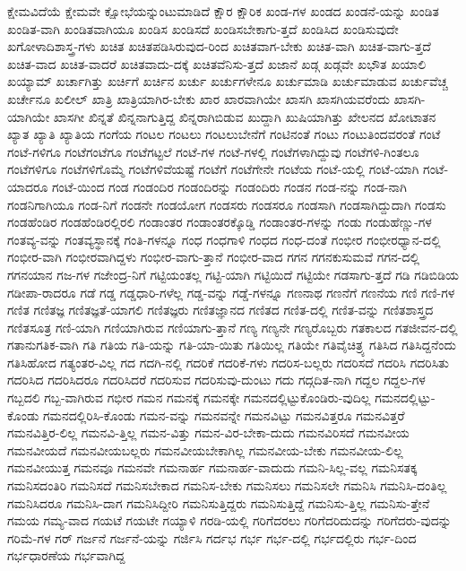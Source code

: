 {ಕ್ಷೇಮವಿದೆಯೆ
ಕ್ಷೇಮವೇ
ಕ್ಷೋಭೆಯನ್ನುಂಟುಮಾಡಿದೆ
ಕ್ಷೌರ
ಕ್ಷೌರಿಕ
ಖಂಡ-ಗಳ
ಖಂಡದ
ಖಂಡನೆ-ಯನ್ನು
ಖಂಡಿತ
ಖಂಡಿತ-ವಾಗಿ
ಖಂಡಿತವಾಗಿಯೂ
ಖಂಡಿಸ
ಖಂಡಿಸದೆ
ಖಂಡಿಸಬೇಕಾಗು-ತ್ತದೆ
ಖಂಡಿಸಿದ
ಖಂಡಿಸುವುದೇ
ಖಗೋಳಾದಿಶಾಸ್ತ್ರ-ಗಳು
ಖಚಿತ
ಖಚಿತಪಡಿಸಿರುವುದ-ರಿಂದ
ಖಚಿತವಾಗ-ಬೇಕು
ಖಚಿತ-ವಾಗಿ
ಖಚಿತ-ವಾಗು-ತ್ತದೆ
ಖಚಿತ-ವಾದ
ಖಚಿತ-ವಾದರೆ
ಖಚಿತವಾದು-ದಕ್ಕೆ
ಖಚಿತವೆನಿಸು-ತ್ತದೆ
ಖಜಾನೆ
ಖಡ್ಗ
ಖಡ್ಗವೇ
ಖಭೌತ
ಖಯಾಲಿ
ಖಯ್ಯಾಮ್
ಖರ್ಚಾಗಿತ್ತು
ಖರ್ಚಿಗೆ
ಖರ್ಚಿನ
ಖರ್ಚು
ಖರ್ಚುಗಳೇನೂ
ಖರ್ಚುಮಾಡಿ
ಖರ್ಚುಮಾಡುವ
ಖರ್ಚುವೆಚ್ಚ
ಖರ್ಚೇನೂ
ಖಲೀಲ್
ಖಾತ್ರಿ
ಖಾತ್ರಿಯಾಗಿರ-ಬೇಕು
ಖಾರ
ಖಾರವಾಗಿಯೇ
ಖಾಸಗಿ
ಖಾಸಗಿಯವರೆಂದು
ಖಾಸಗಿ-ಯಾಗಿಯೇ
ಖಾಸಗೀ
ಖಿನ್ನತೆ
ಖಿನ್ನನಾಗುತ್ತಿದ್ದ
ಖಿನ್ನರಾಗಿಬಿಡುವ
ಖುದ್ದಾಗಿ
ಖುಷಿಯಾಗಿತ್ತು
ಖೇಲನದ
ಖೋಟಾತನ
ಖ್ಯಾತ
ಖ್ಯಾತಿ
ಖ್ಯಾತಿಯ
ಗಂಗೆಯ
ಗಂಟಲ
ಗಂಟಲು
ಗಂಟಲುಬೇನೆಗೆ
ಗಂಟಿನಂತೆ
ಗಂಟು
ಗಂಟುತಿಂದವರಂತೆ
ಗಂಟೆ
ಗಂಟೆ-ಗಳಿಗೂ
ಗಂಟೆಗಂಟೆಗೂ
ಗಂಟೆಗಟ್ಟಲೆ
ಗಂಟೆ-ಗಳ
ಗಂಟೆ-ಗಳಲ್ಲಿ
ಗಂಟೆಗಳಾಗಿದ್ದುವು
ಗಂಟೆಗಳಿ-ಗಿಂತಲೂ
ಗಂಟೆಗಳಿಗೂ
ಗಂಟೆಗಳಿಗೊಮ್ಮೆ
ಗಂಟೆಗಳಿವೆಯಷ್ಟೆ
ಗಂಟೆಗೆ
ಗಂಟೆಗೇನೇ
ಗಂಟೆಯ
ಗಂಟೆ-ಯಲ್ಲಿ
ಗಂಟೆ-ಯಾಗಿ
ಗಂಟೆ-ಯಾದರೂ
ಗಂಟೆ-ಯಿಂದ
ಗಂಡ
ಗಂಡಂದಿರ
ಗಂಡಂದಿರನ್ನು
ಗಂಡಂದಿರು
ಗಂಡನ
ಗಂಡ-ನನ್ನು
ಗಂಡ-ನಾಗಿ
ಗಂಡನಿಗಾಗಿಯೂ
ಗಂಡ-ನಿಗೆ
ಗಂಡನೇ
ಗಂಡಯೋಗ
ಗಂಡಸರು
ಗಂಡಸರೂ
ಗಂಡಸಾಗಿ
ಗಂಡಸಾಗಿದ್ದುದಾಗಿ
ಗಂಡಸು
ಗಂಡಹೆಂಡಿರ
ಗಂಡಹೆಂಡಿರಲ್ಲಿರಲಿ
ಗಂಡಾಂತರ
ಗಂಡಾಂತರಕ್ಕೊಡ್ಡಿ
ಗಂಡಾಂತರ-ಗಳನ್ನು
ಗಂಡು
ಗಂಡುಹೆಣ್ಣು-ಗಳ
ಗಂತವ್ಯ-ವನ್ನು
ಗಂತವ್ಯಸ್ಥಾನಕ್ಕೆ
ಗಂತಿ-ಗಳನ್ನೂ
ಗಂಧ
ಗಂಧಗಾಳಿ
ಗಂಧದ
ಗಂಧ-ದಂತೆ
ಗಂಭೀರ
ಗಂಭೀರಧ್ಯಾನ-ದಲ್ಲಿ
ಗಂಭೀರ-ವಾಗಿ
ಗಂಭೀರವಾಗಿದ್ದಳು
ಗಂಭೀರ-ವಾಗು-ತ್ತಾನೆ
ಗಂಭೀರ-ವಾದ
ಗಗನ
ಗಗನಕುಸುಮವೆ
ಗಗನ-ದಲ್ಲಿ
ಗಗನಯಾನ
ಗಜ-ಗಳ
ಗಜೇಂದ್ರ-ನಿಗೆ
ಗಟ್ಟಿಯಂತಲ್ಲ
ಗಟ್ಟಿ-ಯಾಗಿ
ಗಟ್ಟಿಯಿದೆ
ಗಟ್ಟಿಯೇ
ಗಡಸಾಗು-ತ್ತದೆ
ಗಡಿ
ಗಡಿಬಿಡಿಯ
ಗಡೀಪಾ-ರಾದರೂ
ಗಡೆ
ಗಡ್ಡ
ಗಡ್ಡಧಾರಿ-ಗಳೆಲ್ಲ
ಗಡ್ಡ-ವನ್ನು
ಗಡ್ಡೆ-ಗಳನ್ನೂ
ಗಣನಾಥ
ಗಣನೆಗೆ
ಗಣನೆಯ
ಗಣಿ
ಗಣಿ-ಗಳ
ಗಣಿತ
ಗಣಿತಜ್ಞ
ಗಣಿತಜ್ಞತೆ-ಯಾಗಲಿ
ಗಣಿತಜ್ಞರು
ಗಣಿತಜ್ಞಾನದ
ಗಣಿತದ
ಗಣಿತ-ದಲ್ಲಿ
ಗಣಿತ-ವನ್ನು
ಗಣಿತಶಾಸ್ತ್ರದ
ಗಣಿತಸೂತ್ರ
ಗಣಿ-ಯಾಗಿ
ಗಣಿಯಾಗಿರುವ
ಗಣಿಯಾಗು-ತ್ತಾನೆ
ಗಣ್ಯ
ಗಣ್ಯನೇ
ಗಣ್ಯರೊಬ್ಬರು
ಗತಕಾಲದ
ಗತಜೀವನ-ದಲ್ಲಿ
ಗತಾನುಗತಿಕ-ವಾಗಿ
ಗತಿ
ಗತಿಯ
ಗತಿ-ಯನ್ನು
ಗತಿ-ಯಾ-ಯಿತು
ಗತಿಯಿಲ್ಲ
ಗತಿಯೇ
ಗತಿವೈಚಿತ್ರ್ಯ
ಗತಿಸಿದ
ಗತಿಸಿದ್ದನೆಂದು
ಗತಿಸಿಹೋದ
ಗತ್ಯಂತರ-ವಿಲ್ಲ
ಗದ
ಗದಗಿ-ನಲ್ಲಿ
ಗದರಿಕೆ
ಗದರಿಕೆ-ಗಳು
ಗದರಿಸ-ಬಲ್ಲರು
ಗದರಿಸದೆ
ಗದರಿಸಿ
ಗದರಿಸಿತು
ಗದರಿಸಿದ
ಗದರಿಸಿದರೂ
ಗದರಿಸಿದರೆ
ಗದರಿಸುವ
ಗದರಿಸುವು-ದುಂಟು
ಗದು
ಗದ್ಗದಿತ-ನಾಗಿ
ಗದ್ದಲ
ಗದ್ದಲ-ಗಳ
ಗಬ್ಬದಲಿ
ಗಬ್ಬ-ವಾಗಿರುವ
ಗಭೀರ
ಗಮನ
ಗಮನಕ್ಕೆ
ಗಮನಕ್ಕೇ
ಗಮನದಲ್ಲಿಟ್ಟುಕೊಂಡಿರು-ವುದಿಲ್ಲ
ಗಮನದಲ್ಲಿಟ್ಟು-ಕೊಂಡು
ಗಮನದಲ್ಲಿರಿಸಿ-ಕೊಂಡು
ಗಮನ-ವನ್ನು
ಗಮನವನ್ನೇ
ಗಮನವಿಟ್ಟು
ಗಮನವಿತ್ತರೂ
ಗಮನವಿತ್ತರೆ
ಗಮನವಿತ್ತಿರ-ಲಿಲ್ಲ
ಗಮನವಿ-ತ್ತಿಲ್ಲ
ಗಮನ-ವಿತ್ತು
ಗಮನ-ವಿರ-ಬೇಕಾ-ದುದು
ಗಮನವಿರಿಸದೆ
ಗಮನವೀಯ
ಗಮನವೀಯದೆ
ಗಮನವೀಯಬಲ್ಲರು
ಗಮನವೀಯಬೇಕಾಗಿಲ್ಲ
ಗಮನವೀಯ-ಬೇಕು
ಗಮನವೀಯ-ಲಿಲ್ಲ
ಗಮನವೀಯುತ್ತ
ಗಮನವೂ
ಗಮನವೇ
ಗಮನಾರ್ಹ
ಗಮನಾರ್ಹ-ವಾದುದು
ಗಮನಿ-ಸಿಲ್ಲ-ವಲ್ಲ
ಗಮನಿಸತಕ್ಕ
ಗಮನಿಸದಂತಿರಿ
ಗಮನಿಸದೆ
ಗಮನಿಸಬೇಕಾದ
ಗಮನಿಸ-ಬೇಕು
ಗಮನಿಸಲು
ಗಮನಿಸಲೇ
ಗಮನಿಸಿ
ಗಮನಿಸಿ-ದಂತಿಲ್ಲ
ಗಮನಿಸಿದರೂ
ಗಮನಿಸಿ-ದಾಗ
ಗಮನಿಸಿದ್ದೀರಿ
ಗಮನಿಸುತ್ತಿದ್ದರು
ಗಮನಿಸುತ್ತಿದ್ದೆ
ಗಮನಿಸು-ತ್ತಿಲ್ಲ
ಗಮನಿಸು-ತ್ತೇನೆ
ಗಮಯ
ಗಮ್ಯ-ವಾದ
ಗಯಟೆ
ಗಯಟೇ
ಗಯ್ಯಾಳಿ
ಗರಡಿ-ಯಲ್ಲಿ
ಗರಿಗೆದರಲು
ಗರಿಗೆದರಿದುದನ್ನು
ಗರಿಗೆದರು-ವುದನ್ನು
ಗರಿಮೆ-ಗಳ
ಗರ್
ಗರ್ಜನೆ
ಗರ್ಜನೆ-ಯನ್ನು
ಗರ್ಜಿಸಿ
ಗರ್ದಭ
ಗರ್ಭ
ಗರ್ಭ-ದಲ್ಲಿ
ಗರ್ಭದಲ್ಲಿರು
ಗರ್ಭ-ದಿಂದ
ಗರ್ಭಧಾರಣೆಯ
ಗರ್ಭವಾಗಿದ್ದ
}
